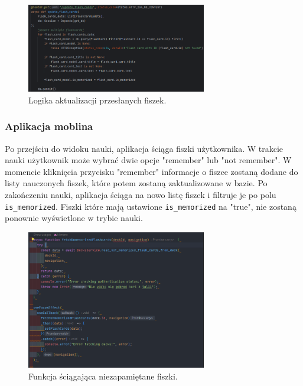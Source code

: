 \begin{figure}[H]
    \centering
    \includegraphics[width=0.7\textwidth]{chapters/chapter_8/screens/update_flash_card_memorized_backend}
    \caption{Logika aktualizacji przesłanych fiszek.}
    \label{img:update_flash_card_memorized_backend}
\end{figure}

\subsubsection{Aplikacja moblina}

Po przejściu do widoku nauki, aplikacja ściąga fiszki użytkownika. W trakcie nauki użytkownik może wybrać dwie opcje "remember" lub "not remember". W momencie kliknięcia przycisku "remember" informacje o fiszce zostaną dodane do listy nauczonych fiszek, które potem zostaną zaktualizowane w bazie. Po zakończeniu nauki, aplikacja ściąga na nowo listę fiszek i filtruje je po polu \texttt{is\_memorized}. Fiszki które mają ustawione \texttt{is\_memorized} na "true", nie zostaną ponownie wyświetlone w trybie nauki.

\begin{figure}[H]
    \centering
    \includegraphics[width=0.7\textwidth]{chapters/chapter_8/screens/get_unmemorized_flash_cards_mobile}
    \caption{Funkcja ściągająca niezapamiętane fiszki.}
    \label{img:get_unmemorized_flash_cards_mobile}
\end{figure}

